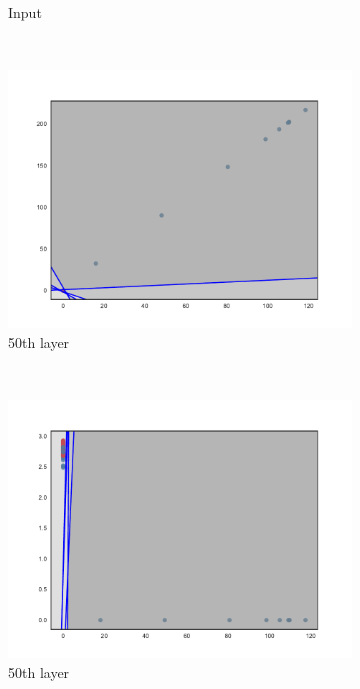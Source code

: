 \begin{figure}
\begin{subfigure}[b]{0.3\textwidth}
        \caption{\SepUnitPoint Input}
        \label{fig:unitpointInitInput}
    \end{subfigure}
    ~ %
    \begin{subfigure}[b]{0.3\textwidth}
        \includegraphics[width=\textwidth]{img/init/unitpointwise/conv2d_50-0.pdf}
        \caption{\SepUnitPoint 50th layer}
        \label{fig:unitpointInit501}
    \end{subfigure}
    ~ %
    \begin{subfigure}[b]{0.3\textwidth}
        \includegraphics[width=\textwidth]{img/init/unitpointwise/conv2d_50-2.pdf}
        \caption{\SepUnitPoint 50th layer}
        \label{fig:unitpointInit5012}
    \end{subfigure}
    
  \caption{} 
  \label{fig:init} 
\end{figure}





